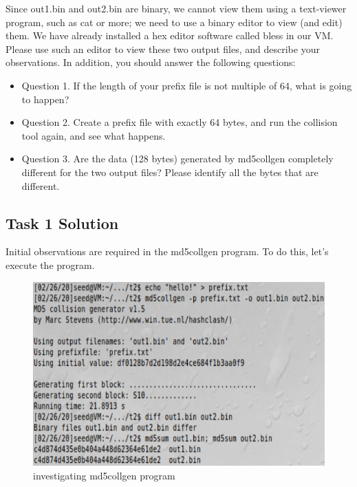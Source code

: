 \documentclass[12pt]{article}
\newcommand\tab[1][0.5cm]{\hspace*{#1}}
\begin{document}
\tab Since out1.bin and out2.bin are binary, we cannot view them using a text-viewer program, such
as cat or more; we need to use a binary editor to view (and edit) them. We have already installed a hex
editor software called bless in our VM. Please use such an editor to view these two output files, and
describe your observations. In addition, you should answer the following questions:
\begin{itemize}
	\item Question 1. If the length of your prefix file is not multiple of 64, what is going to happen?
	\item Question 2. Create a prefix file with exactly 64 bytes, and run the collision tool again, and see what happens.
	\item Question 3. Are the data (128 bytes) generated by md5collgen completely different for the two
output files? Please identify all the bytes that are different.	
\end{itemize}



\subsection{Task 1 Solution}

Initial observations are required in the md5collgen program. To do this, let's execute the program.

\begin{figure}[H]
	\begin{center}
		\includegraphics[scale=0.65]{pics/t1p00.png}
	\end{center}{}
	\caption{investigating md5collgen program}
	\label{fig:t1p00}
\end{figure}
\end{document}
